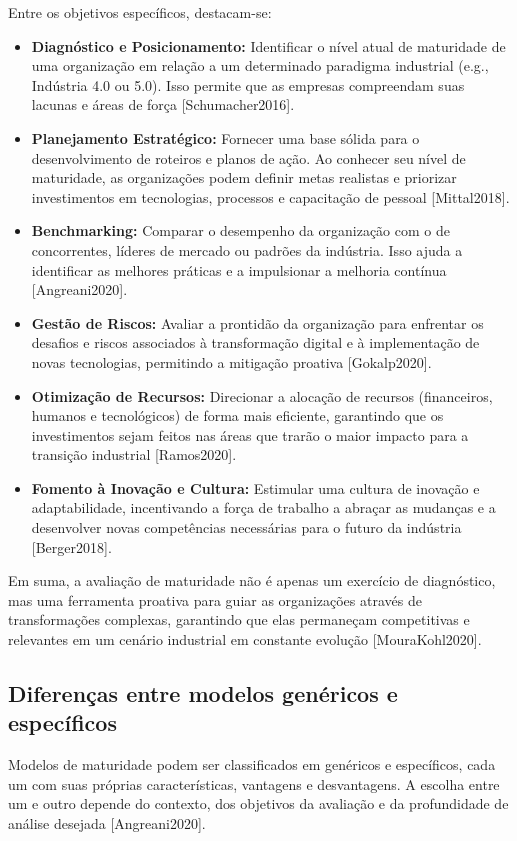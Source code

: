 Entre os objetivos específicos, destacam-se:
\begin{itemize}
    \item \textbf{Diagnóstico e Posicionamento:} Identificar o nível atual de maturidade de uma organização em relação a um determinado paradigma industrial (e.g., Indústria 4.0 ou 5.0). Isso permite que as empresas compreendam suas lacunas e áreas de força [Schumacher2016].
    \item \textbf{Planejamento Estratégico:} Fornecer uma base sólida para o desenvolvimento de roteiros e planos de ação. Ao conhecer seu nível de maturidade, as organizações podem definir metas realistas e priorizar investimentos em tecnologias, processos e capacitação de pessoal [Mittal2018].
    \item \textbf{Benchmarking:} Comparar o desempenho da organização com o de concorrentes, líderes de mercado ou padrões da indústria. Isso ajuda a identificar as melhores práticas e a impulsionar a melhoria contínua [Angreani2020].
    \item \textbf{Gestão de Riscos:} Avaliar a prontidão da organização para enfrentar os desafios e riscos associados à transformação digital e à implementação de novas tecnologias, permitindo a mitigação proativa [Gokalp2020].
    \item \textbf{Otimização de Recursos:} Direcionar a alocação de recursos (financeiros, humanos e tecnológicos) de forma mais eficiente, garantindo que os investimentos sejam feitos nas áreas que trarão o maior impacto para a transição industrial [Ramos2020].
    \item \textbf{Fomento à Inovação e Cultura:} Estimular uma cultura de inovação e adaptabilidade, incentivando a força de trabalho a abraçar as mudanças e a desenvolver novas competências necessárias para o futuro da indústria [Berger2018].
\end{itemize}

Em suma, a avaliação de maturidade não é apenas um exercício de diagnóstico, mas uma ferramenta proativa para guiar as organizações através de transformações complexas, garantindo que elas permaneçam competitivas e relevantes em um cenário industrial em constante evolução [MouraKohl2020].

\subsection{Diferenças entre modelos genéricos e específicos}

Modelos de maturidade podem ser classificados em genéricos e específicos, cada um com suas próprias características, vantagens e desvantagens. A escolha entre um e outro depende do contexto, dos objetivos da avaliação e da profundidade de análise desejada [Angreani2020].

